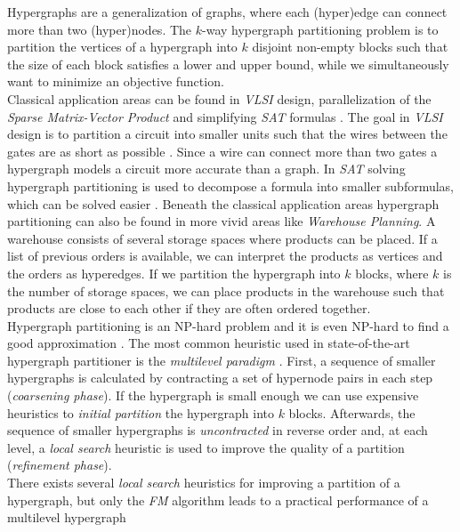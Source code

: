 Hypergraphs are a generalization of graphs, where each (hyper)edge can connect 
more than two (hyper)nodes. The $k$-way hypergraph partitioning problem is to 
partition the vertices of a hypergraph into $k$ disjoint non-empty blocks such
that the size of each block satisfies a lower and upper bound, while we simultaneously 
want to minimize an objective function. \\
Classical application areas can be found in \emph{VLSI} design, parallelization of
the \emph{Sparse Matrix-Vector Product} and simplifying \emph{SAT} formulas 
\cite{karypis1999multilevel, mann2014formula, papa2007hypergraph}. The goal 
in \emph{VLSI} design is to partition a circuit into smaller units such that
the wires between the gates are as short as possible \cite{bulucc2016recent}.
Since a wire can connect more than two gates a hypergraph models a circuit more
accurate than a graph. In \emph{SAT} solving hypergraph partitioning is used to
decompose a formula into smaller subformulas, which can be solved easier \cite{mann2014formula}.
Beneath the classical application areas hypergraph partitioning can also be found
in more vivid areas like \emph{Warehouse Planning}. A warehouse consists of several
storage spaces where products can be placed. If a list of previous orders is available, 
we can interpret the products as vertices and the orders as hyperedges. If we
partition the hypergraph into $k$ blocks, where $k$ is the number of storage spaces,
we can place products in the warehouse such that products are close to each other if
they are often ordered together.\\
Hypergraph partitioning is an NP-hard problem \cite{lengauer2012combinatorial} and
it is even NP-hard to find a good approximation \cite{bui1992finding}.
The most common heuristic used in state-of-the-art hypergraph partitioner is the
\emph{multilevel paradigm} \cite{catalyurek1999hypergraph, heuer2017improving, karypis1999multilevel}.
First, a sequence of smaller hypergraphs is calculated by contracting a set of hypernode pairs
in each step (\emph{coarsening phase}). If the hypergraph is small enough we can use expensive
heuristics to \emph{initial partition} the hypergraph into $k$ blocks. Afterwards, the sequence
of smaller hypergraphs is \emph{uncontracted} in reverse order and, at each level, a 
\emph{local search} heuristic is used to improve the quality of a partition 
(\emph{refinement phase}). \\
There exists several \emph{local search} heuristics for improving a partition of a hypergraph,
but only the \emph{FM} algorithm leads to a practical performance of a multilevel hypergraph
